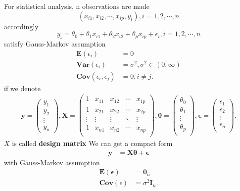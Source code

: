 \noindent For statistical analysis, n observations are made
\[
(x_{i1},x_{i2},\cdots,x_{ip},y_i),i = 1,2,\cdots,n
\]
accordingly
\[
	y_i = \theta_0 + \theta_1 x_{i1} + \theta_2 x_{i2} + \theta_p x_{ip}  + \epsilon_i, i = 1,2,\cdots,n
\]
satisfy Gauss-Markov assumption 
\begin{align*}
	\mathbf{E}(\epsilon_i)  			&= 0\\
	\mathbf{Var}(\epsilon_i) 			&= \sigma^2, \sigma^2\in (0,\infty)\\
	\mathbf{Cov}(\epsilon_i,\epsilon_j) &= 0, i \neq j.
\end{align*}
if we denote
\begin{align*}
	\mathbf{y} =
				\begin{pmatrix}
				y_1\\
				y_2\\
				\vdots\\
				y_n
				\end{pmatrix}
,
	\mathbf{X} =
				\begin{pmatrix}
				1 		&x_{11} &x_{12} &\cdots &x_{1p}\\
				1 		&x_{21} &x_{22} &\cdots &x_{2p}\\
				\vdots	&\vdots		 &\vdots	  &\ddots  &\vdots     \\
				1 		&x_{n1} &x_{n2} &\cdots &x_{np}\\
				\end{pmatrix}
,
	\mathbf{\theta} =
				\begin{pmatrix}
				\theta_0\\
				\theta_1\\
				\vdots\\
				\theta_p\\
				\end{pmatrix}
,
	\mathbf{\epsilon} =
				\begin{pmatrix}
				\epsilon_1\\
				\epsilon_2\\
				\vdots\\
				\epsilon_n\\
				\end{pmatrix}.
\end{align*}
\noindent $X$ is called \textbf{design matrix}
\noindent We can get a compact form
\begin{align}
	\mathbf{y} &= \mathbf{X}\mathbf{\theta} + \mathbf{\epsilon}
\end{align}
with  Gauss-Markov assumption 
\begin{align}
	\mathbf{E}(\mathbf{\epsilon}) &= \mathbf{0}_n\\
	\mathbf{Cov}(\epsilon) &= \sigma ^2\mathbf{I}_n.
\end{align}
 



